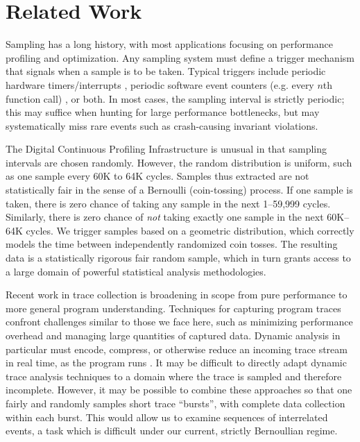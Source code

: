 \section{Related Work}
\label{sec:related-work}

Sampling has a long history, with most applications focusing on
performance profiling and optimization.  Any sampling system must
define a trigger mechanism that signals when a sample is to be taken.
Typical triggers include periodic hardware timers/interrupts
\cite{Burrows:2000:EFV,Traub:200:EILPP,Whaley:337483}, periodic
software event counters (e.g.  every $n$th function call)
\cite{Arnold:2000:ACCTS}, or both.  In most cases, the sampling
interval is strictly periodic; this may suffice when hunting for large
performance bottlenecks, but may systematically miss rare events such
as crash-causing invariant violations.

The Digital Continuous Profiling Infrastructure
\cite{Anderson:1997:CPW} is unusual in that sampling intervals are
chosen randomly.  However, the random distribution is uniform, such as
one sample every 60K to 64K cycles.  Samples thus extracted are not
statistically fair in the sense of a Bernoulli (coin-tossing) process.
If one sample is taken, there is zero chance of taking any sample in
the next 1--59,999 cycles.  Similarly, there is zero chance of
\emph{not} taking exactly one sample in the next 60K--64K cycles.  We
trigger samples based on a geometric distribution, which correctly
models the time between independently randomized coin tosses.  The
resulting data is a statistically rigorous fair random sample, which
in turn grants access to a large domain of powerful statistical
analysis methodologies.

Recent work in trace collection is broadening in scope from pure
performance to more general program understanding.  Techniques for
capturing program traces confront challenges similar to those we face
here, such as minimizing performance overhead and managing large
quantities of captured data.  Dynamic analysis in particular must
encode, compress, or otherwise reduce an incoming trace stream in real
time, as the program runs \cite{Demsky:RBEOOP:2002,ICSE01*221}.  It
may be difficult to directly adapt dynamic trace analysis techniques
to a domain where the trace is sampled and therefore incomplete.
However, it may be possible to combine these approaches so that one
fairly and randomly samples short trace ``bursts'', with complete data
collection within each burst.  This would allow us to examine
sequences of interrelated events, a task which is difficult under our
current, strictly Bernoullian regime.

